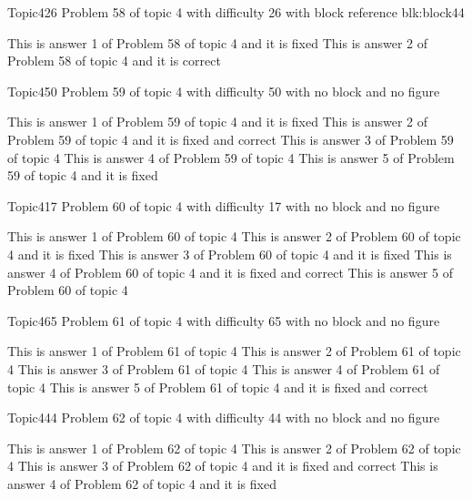 \documentclass[master]{exam}
\begin{document}
\begin{problem}[requires=blk:block44]{Topic4}{26}
	Problem 58 of topic 4 with difficulty 26 with block reference blk:block44
	\begin{answers}
		\answer[fixed] This is answer 1 of Problem 58 of topic 4 and it is fixed
		\answer[correct] This is answer 2 of Problem 58 of topic 4 and it is correct
	\end{answers}
\end{problem}

\begin{problem}{Topic4}{50}
	Problem 59 of topic 4 with difficulty 50 with no block and no figure
	\begin{answers}
		\answer[fixed] This is answer 1 of Problem 59 of topic 4 and it is fixed
		 This is answer 2 of Problem 59 of topic 4 and it is fixed and correct
		\answer This is answer 3 of Problem 59 of topic 4 
		\answer This is answer 4 of Problem 59 of topic 4 
		\answer[fixed] This is answer 5 of Problem 59 of topic 4 and it is fixed
	\end{answers}
\end{problem}

\begin{problem}{Topic4}{17}
	Problem 60 of topic 4 with difficulty 17 with no block and no figure
	\begin{answers}
		\answer This is answer 1 of Problem 60 of topic 4 
		\answer[fixed] This is answer 2 of Problem 60 of topic 4 and it is fixed
		\answer[fixed] This is answer 3 of Problem 60 of topic 4 and it is fixed
		 This is answer 4 of Problem 60 of topic 4 and it is fixed and correct
		\answer This is answer 5 of Problem 60 of topic 4 
	\end{answers}
\end{problem}

\begin{problem}{Topic4}{65}
	Problem 61 of topic 4 with difficulty 65 with no block and no figure
	\begin{answers}
		\answer This is answer 1 of Problem 61 of topic 4 
		\answer This is answer 2 of Problem 61 of topic 4 
		\answer This is answer 3 of Problem 61 of topic 4 
		\answer This is answer 4 of Problem 61 of topic 4 
		 This is answer 5 of Problem 61 of topic 4 and it is fixed and correct
	\end{answers}
\end{problem}

\begin{problem}{Topic4}{44}
	Problem 62 of topic 4 with difficulty 44 with no block and no figure
	\begin{answers}
		\answer This is answer 1 of Problem 62 of topic 4 
		\answer This is answer 2 of Problem 62 of topic 4 
		 This is answer 3 of Problem 62 of topic 4 and it is fixed and correct
		\answer[fixed] This is answer 4 of Problem 62 of topic 4 and it is fixed
	\end{answers}
\end{problem}
\end{document}
